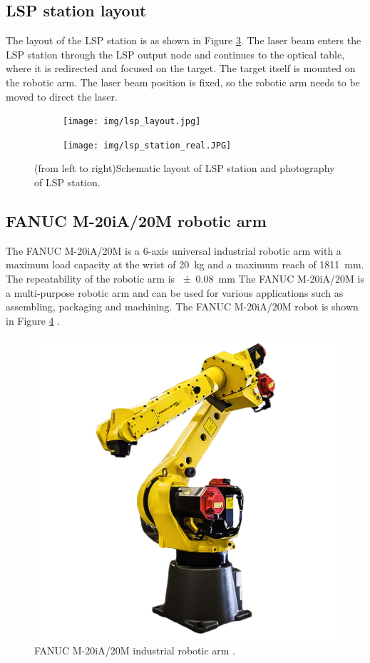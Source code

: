 \subsection{LSP station layout}

The layout of the LSP station is as shown in Figure \ref{fig:lsplayout}. The laser
beam enters the LSP station through the LSP output node and
continues to the optical table, where it is redirected and
focused on the target. The target itself is mounted on the
robotic arm. The laser beam position is fixed, so the robotic
arm needs to be moved to direct the laser.

\begin{figure}[t!]
\centering
\begin{subfigure}{.45\textwidth}

    \texttt{[image: img/lsp\_layout.jpg]}

    \label{fig:a}
\end{subfigure}
\begin{subfigure}{.45\textwidth}

    \texttt{[image: img/lsp\_station\_real.JPG]}

    \label{fig:b}
\end{subfigure}

\caption{(from left to right)Schematic layout of LSP station and photography of LSP station.}
\label{fig:lsplayout}
\end{figure}

\subsection{FANUC M-20iA/20M robotic arm}

The FANUC M-20iA/20M is a 6-axis universal industrial robotic arm with a maximum load capacity at the wrist of \SI{20}{\kg} and a maximum reach of \SI{1811}{\mm}. The repeatability of the robotic arm is \SI{+-0.08}{\mm} The FANUC M-20iA/20M is a multi-purpose robotic arm and can be used for various applications such as assembling, packaging and machining. The  FANUC M-20iA/20M robot is shown in Figure \ref{fig:fanucrobot} \cite{fanucrobot}.

\begin{figure}[h]
    \centering
    \includegraphics[width=0.6\linewidth]{img/fanuc_robot.png}
    \caption{FANUC M-20iA/20M industrial robotic arm  \cite{fanucrobot}.}
    \label{fig:fanucrobot}
\end{figure}

